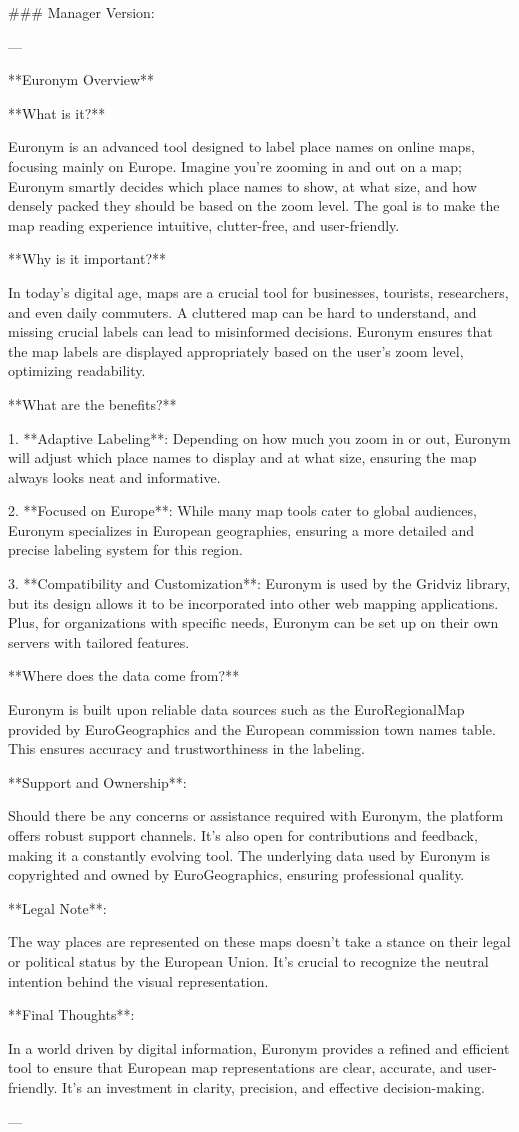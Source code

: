 ### Manager Version:

---

**Euronym Overview**

**What is it?**

Euronym is an advanced tool designed to label place names on online maps, focusing mainly on Europe. Imagine you're zooming in and out on a map; Euronym smartly decides which place names to show, at what size, and how densely packed they should be based on the zoom level. The goal is to make the map reading experience intuitive, clutter-free, and user-friendly.

**Why is it important?**

In today's digital age, maps are a crucial tool for businesses, tourists, researchers, and even daily commuters. A cluttered map can be hard to understand, and missing crucial labels can lead to misinformed decisions. Euronym ensures that the map labels are displayed appropriately based on the user's zoom level, optimizing readability.

**What are the benefits?**

1. **Adaptive Labeling**: Depending on how much you zoom in or out, Euronym will adjust which place names to display and at what size, ensuring the map always looks neat and informative.
   
2. **Focused on Europe**: While many map tools cater to global audiences, Euronym specializes in European geographies, ensuring a more detailed and precise labeling system for this region.
   
3. **Compatibility and Customization**: Euronym is used by the Gridviz library, but its design allows it to be incorporated into other web mapping applications. Plus, for organizations with specific needs, Euronym can be set up on their own servers with tailored features.

**Where does the data come from?**

Euronym is built upon reliable data sources such as the EuroRegionalMap provided by EuroGeographics and the European commission town names table. This ensures accuracy and trustworthiness in the labeling.

**Support and Ownership**:

Should there be any concerns or assistance required with Euronym, the platform offers robust support channels. It's also open for contributions and feedback, making it a constantly evolving tool. The underlying data used by Euronym is copyrighted and owned by EuroGeographics, ensuring professional quality.

**Legal Note**:

The way places are represented on these maps doesn't take a stance on their legal or political status by the European Union. It's crucial to recognize the neutral intention behind the visual representation.

**Final Thoughts**:

In a world driven by digital information, Euronym provides a refined and efficient tool to ensure that European map representations are clear, accurate, and user-friendly. It's an investment in clarity, precision, and effective decision-making.

---